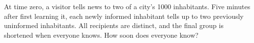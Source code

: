 At time zero, a visitor tells news to two of a city's 1000 inhabitants. Five minutes after first learning it, each newly informed inhabitant tells up to two previously uninformed inhabitants. All recipients are distinct, and the final group is shortened when everyone knows. How soon does everyone know?
